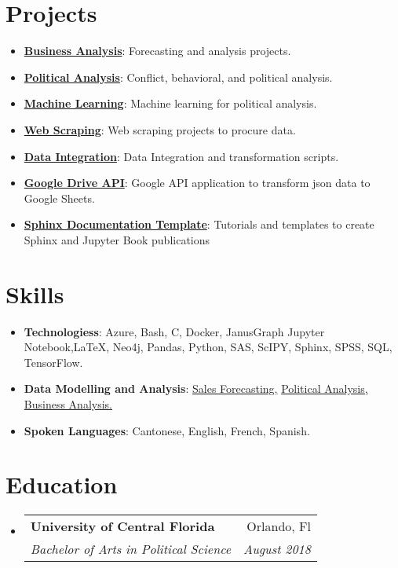 \documentclass[letterpaper,11pt]{article}
\makeatletter
\newcommand{\resumeItem}[2]{
  \item\small{
    \textbf{#1}{: #2 \vspace{-2pt}}
  }
}
\newcommand{\resumeSubheading}[4]{
  \vspace{-1pt}\item
    \begin{tabular*}{0.97\textwidth}[t]{l@{\extracolsep{\fill}}r}
      \textbf{#1} & #2 \\
      \textit{\small#3} & \textit{\small #4} \\
    \end{tabular*}\vspace{-5pt}
}
\newcommand{\resumeSubItem}[2]{\resumeItem{#1}{#2}\vspace{-4pt}}
\newcommand{\resumeSubHeadingListStart}{\begin{itemize}[leftmargin=*]}
\newcommand{\resumeSubHeadingListEnd}{\end{itemize}}
\makeatother
\begin{document}
\section{Projects}
  \resumeSubHeadingListStart
    \resumeSubItem{\href{https://docs.jnapolitano.io/parts/analysis/business-analysis/index.html}{Business Analysis}}
      {Forecasting and analysis projects.}
    \resumeSubItem{\href{https://docs.jnapolitano.io/parts/analysis/political-analysis/index.html}{Political Analysis}}
      {Conflict, behavioral, and political analysis.}
    \resumeSubItem{\href{https://docs.jnapolitano.io/parts/ml-ai/index.htmll}{Machine Learning}}
      {Machine learning for political analysis.}
    \resumeSubItem{\href{https://docs.jnapolitano.io/parts/data/web-scraping/index.html}{Web Scraping}}
      {Web scraping projects to procure data.}
    \resumeSubItem{\href{https://docs.jnapolitano.io/parts/data/data-integration/index.html}{Data Integration}}
      {Data Integration and transformation scripts.}
    \resumeSubItem{\href{https://docs.jnapolitano.io/parts/python-development/google/index.html}{Google Drive API}}
      {Google API application to transform json data to Google Sheets.}
    \resumeSubItem{\href{https://journal.jnapolitano.io/parts/tutorials/sphinx/docs/build-this-site.html}{Sphinx Documentation Template}}
      {Tutorials and templates to create Sphinx and Jupyter Book publications}
  \resumeSubHeadingListEnd


\section{Skills}
\resumeSubHeadingListStart
  \resumeSubItem{Technologiess}
    {Azure, Bash, C, Docker, JanusGraph Jupyter Notebook,LaTeX, Neo4j, Pandas, Python, SAS, ScIPY, Sphinx, SPSS, SQL, TensorFlow.}
  \resumeSubItem{Data Modelling and Analysis}
    {\href{https://docs.jnapolitano.io/parts/analysis/business-analysis/project-retail-sales-forecasting/code-base/SalesForcasting.html}{Sales Forecasting,} {\href{https://docs.jnapolitano.io/parts/analysis/political-analysis/index.html}{Political Analysis,}} {\href{https://docs.jnapolitano.io/parts/analysis/business-analysis/index.html}{Business Analysis.}}}
  \resumeSubItem{Spoken Languages}
    {Cantonese, English, French, Spanish.}
\resumeSubHeadingListEnd
\section{Education}
\resumeSubHeadingListStart
  \resumeSubheading
    {University of Central Florida}{Orlando, Fl}
    {Bachelor of Arts in Political Science}{August 2018}
\resumeSubHeadingListEnd



\end{document}
